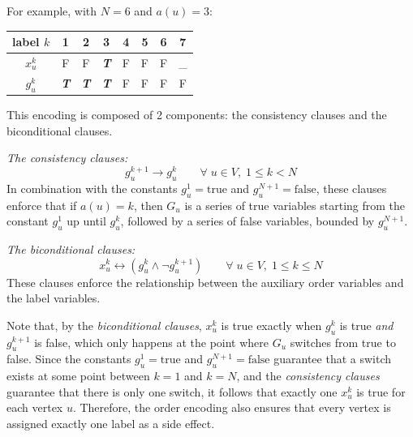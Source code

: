 \documentclass[a4paper,fleqn]{cas-sc}
\begin{document}
            For example, with $N=6$ and $a(u)=3$:
            \begin{center}
                \begin{tabular}{c|ccccccc}
                    label $k$ & 1                   & 2                   & 3                   & 4 & 5 & 6 & 7  \\ \hline
                    $x_u^k$   & F                   & F                   & \textit{\textbf{T}} & F & F & F & \_ \\
                    $g_u^k$   & \textit{\textbf{T}} & \textit{\textbf{T}} & \textit{\textbf{T}} & F & F & F & F  \\
                \end{tabular}
            \end{center}

            \noindent This encoding is composed of 2 components: the consistency clauses and the biconditional clauses.

            \noindent \textit{The consistency clauses:}
            \begin{equation}
                g_u^{k+1} \rightarrow g_u^{k} \qquad \forall \; u\in V,\; 1 \le k < N
            \end{equation}
            In combination with the constants $g_u^1 = \text{true}$ and $g_u^{N+1} = \text{false}$, these clauses enforce that if $a(u)=k$, then $G_u$ is a series of true variables starting from the constant $g_u^1$ up until $g_u^k$, followed by a series of false variables, bounded by $g_u^{N+1}$.

            \vspace{1em}

            \noindent \textit{The biconditional clauses:}
            \begin{equation}
                x_u^k \leftrightarrow (g_u^k \wedge \neg g_u^{k+1}) \qquad \forall \; u\in V,\; 1 \le k \le N
            \end{equation}
            These clauses enforce the relationship between the auxiliary order variables and the label variables.

            \vspace{1em}

            Note that, by the \textit{biconditional clauses}, $x_u^k$ is true exactly when $g_u^k$ is true \textit{and} $g_u^{k+1}$ is false, which only happens at the point where $G_u$ switches from true to false. Since the constants $g_u^1 = \text{true}$ and $g_u^{N+1} = \text{false}$ guarantee that a switch exists at some point between $k=1$ and $k=N$, and the \textit{consistency clauses} guarantee that there is only one switch, it follows that exactly one $x_u^k$ is true for each vertex $u$. Therefore, the order encoding also ensures that every vertex is assigned exactly one label as a side effect.
\end{document}

